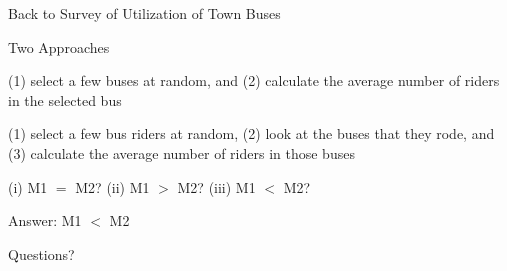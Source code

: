 \begin{frame}{Back to Survey of Utilization of Town Buses}

\plitemsep 0.1in

\bci

\item Two Approaches

  \bce[M1.]
  \item (1) select a few buses at random, and (2) calculate the
    average number of riders in the selected bus

  \item (1) select a few bus riders at random, (2) look at the buses
    that they rode, and (3) calculate the average number of riders in
    those buses
    \ece

\item (i) M1 $=$ M2? (ii) M1 $>$ M2? (iii) M1 $<$ M2?    

\item Answer: M1 $<$ M2

\item {}
  \eci

\end{frame}




\begin{frame}{}
\vspace{2cm}
\LARGE Questions?

\end{frame}

